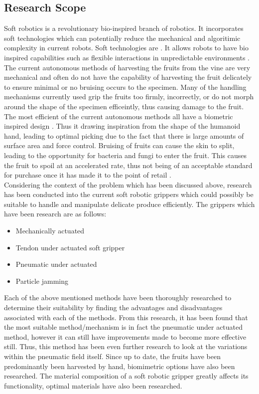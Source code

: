 \documentclass[11pt,twocolumn]{article}
\begin{document}
\subsection{Research Scope}
Soft robotics is a revolutionary bio-inspired branch of robotics. It incorporates soft technologies which can potentially reduce the mechanical and algoritimic complexity in current robots. Soft technologies are . It allows robots to have bio inspired capabilities such as flexible interactions in unpredictable environments \cite{kim2013soft}. The current autonomous methods of harvesting the fruits from the vine are very mechanical and often do not have the capability of harvesting the fruit delicately to ensure minimal or no bruising occurs to the specimen. Many of the handling mechanisms currently used grip the fruits too firmly, incorrectly, or do not morph around the shape of the specimen efficeintly, thus causing damage to the fruit. The most efficient of the current autonomous methods all have a biometric inspired design \cite{hassan2015design}. Thus it drawing inspiration from the shape of the humanoid hand, leading to optimal picking due to the fact that there is large amounts of surface area and force control. Bruising of fruits can cause the skin to split, leading to the opportunity for bacteria and fungi to enter the fruit. This causes the fruit to spoil at an accelerated rate, thus not being of an acceptable standard for purchase once it has made it to the point of retail .
\\
\newline
Considering the context of the problem which has been discussed above, research has been conducted into the current soft robotic grippers which could possibly be suitable to handle and manipulate delicate produce efficiently. The grippers which have been research are as follows:
\begin{itemize}
\item Mechanically actuated
\item Tendon under actuated soft gripper
\item Pneumatic under actuated
\item Particle jamming 
\end{itemize}
Each of the above mentioned methods have been thoroughly researched to determine their suitability by finding the advantages and disadvantages associated with each of the methods. From this research, it has been found that the most suitable method/mechanism is in fact the pneumatic under actuated method, however it can still have improvements made to become more effective still. Thus, this method has been even further research to look at the variations within the pneumatic field itself. Since up to date, the fruits have been predominantly been harvested by hand, biomimetric options have also been researched. The material composition of a soft robotic gripper greatly affects its functionality, optimal materials have also been researched.
\end{document}
